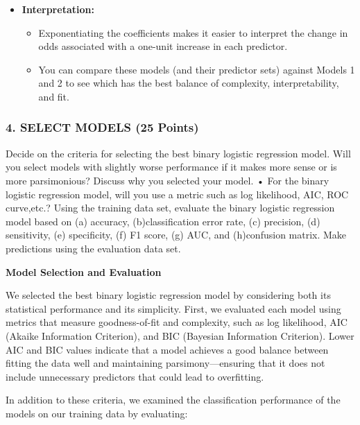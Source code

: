 \documentclass[
]{article}
\begin{document}
\begin{itemize}
\item
  \textbf{Interpretation:}

  \begin{itemize}
  \item
    Exponentiating the coefficients makes it easier to interpret the
    change in odds associated with a one-unit increase in each
    predictor.
  \item
    You can compare these models (and their predictor sets) against
    Models 1 and 2 to see which has the best balance of complexity,
    interpretability, and fit.
  \end{itemize}
\end{itemize}

\subsubsection{4. SELECT MODELS (25
Points)}\label{select-models-25-points}

Decide on the criteria for selecting the best binary logistic regression
model. Will you select models with slightly worse performance if it
makes more sense or is more parsimonious? Discuss why you selected your
model. • For the binary logistic regression model, will you use a metric
such as log likelihood, AIC, ROC curve,etc.? Using the training data
set, evaluate the binary logistic regression model based on (a)
accuracy, (b)classification error rate, (c) precision, (d) sensitivity,
(e) specificity, (f) F1 score, (g) AUC, and (h)confusion matrix. Make
predictions using the evaluation data set.

\textbf{Model Selection and Evaluation}

We selected the best binary logistic regression model by considering
both its statistical performance and its simplicity. First, we evaluated
each model using metrics that measure goodness-of-fit and complexity,
such as log likelihood, AIC (Akaike Information Criterion), and BIC
(Bayesian Information Criterion). Lower AIC and BIC values indicate that
a model achieves a good balance between fitting the data well and
maintaining parsimony---ensuring that it does not include unnecessary
predictors that could lead to overfitting.

In addition to these criteria, we examined the classification
performance of the models on our training data by evaluating:
\end{document}

